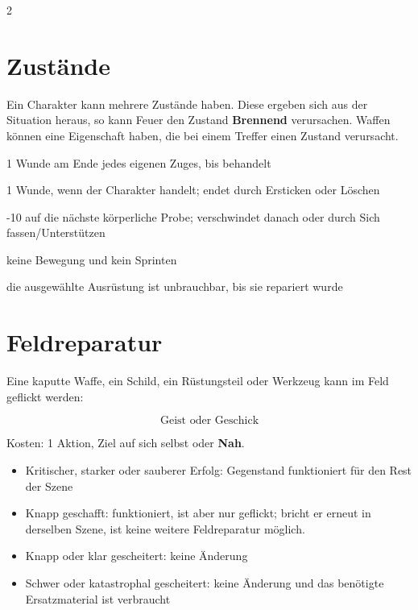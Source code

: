 \begin{multicols*}{2}
\section{Zustände}\label{sec:zustande}

Ein Charakter kann mehrere Zustände haben.
Diese ergeben sich aus der Situation heraus, so kann Feuer den Zustand \textbf{Brennend} verursachen.
Waffen können eine Eigenschaft haben, die bei einem Treffer einen Zustand verursacht.

\begin{description}[style=nextline,leftmargin=0pt]
\item[\textbf{Blutend}] 1 Wunde am Ende jedes eigenen Zuges, bis behandelt
\item[\textbf{Brennend}] 1 Wunde, wenn der Charakter handelt; endet durch Ersticken oder Löschen
\item[\textbf{Erschüttert}] -10 auf die nächste körperliche Probe; verschwindet danach oder durch Sich fassen/Unterstützen
\item[\textbf{Festgesetzt}] keine Bewegung und kein Sprinten
\item[\textbf{Zerstört}] die ausgewählte Ausrüstung ist unbrauchbar, bis sie repariert wurde
\end{description}

\section{Feldreparatur}

Eine kaputte Waffe, ein Schild, ein Rüstungsteil oder Werkzeug kann im Feld geflickt werden:

\[
\text{Geist oder Geschick}
\]

Kosten: 1 Aktion, Ziel auf sich selbst oder \textbf{Nah}.

\begin{itemize}[leftmargin=*]
\item Kritischer, starker oder sauberer Erfolg: Gegenstand funktioniert für den Rest der Szene
\item Knapp geschafft: funktioniert, ist aber nur geflickt; bricht er erneut in derselben Szene, ist keine weitere Feldreparatur möglich.
\item Knapp oder klar gescheitert: keine Änderung
\item Schwer oder katastrophal gescheitert: keine Änderung und das benötigte Ersatzmaterial ist verbraucht
\end{itemize}


\end{multicols*}
